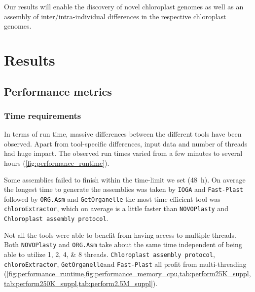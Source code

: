 \documentclass{bmcart}
\newcommand{\formatprogramnames}[1]{\texttt{#1}}
\newcommand{\ce}{\formatprogramnames{chloroExtractor}}
\newcommand{\oa}{\formatprogramnames{ORG.Asm}}
\newcommand{\fp}{\formatprogramnames{Fast-Plast}}
\newcommand{\ioga}{\formatprogramnames{IOGA}}
\newcommand{\np}{\formatprogramnames{NOVOPlasty}}
\newcommand{\go}{\formatprogramnames{GetOrganelle}}
\newcommand{\cassp}{\formatprogramnames{Chloroplast assembly protocol}}
\begin{document}
Our results will enable the discovery of novel chloroplast genomes as well as an assembly of inter/intra-individual differences in the respective chloroplast genomes.  

\section*{Results}
\subsection*{Performance metrics}

\subsubsection*{Time requirements}
In terms of run time, massive differences between the different tools have been observed. Apart from tool-specific differences, input data and number of threads had huge impact. The observed run times varied from a few minutes to several hours (\cref{fig:performance_runtime}).

Some assemblies failed to finish within the time-limit we set (\SI{48}{\hour}). 
On average the longest time to generate the assemblies was taken by \ioga{} and \fp{} followed by \oa{} and \go{} the most time efficient tool was \ce{}, which on average is a little faster than \np{} and \cassp{}.

Not all the tools were able to benefit from having access to multiple threads. Both \np{} and \oa{} take about the same time independent of being able to utilize \numlist[list-final-separator={, or }]{1;2;4;8} threads. \cassp{}, \ce{}, \go  and \fp{} all profit from multi-threading (\cref{fig:performance_runtime,fig:performance_memory_cpu,tab:perform25K_suppl,tab:perform250K_suppl,tab:perform2.5M_suppl}).
\end{document}
